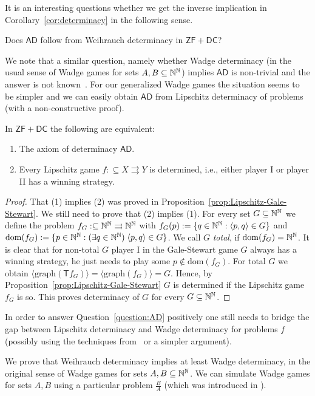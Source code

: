 \documentclass{amsart}
\def\IN{{\Bbb{N}}}
\def\In{\subseteq}
\def\mto{\rightrightarrows}
\def\T{{\mathsf{{T}}}}
\def\dom{{\mathrm{dom}}}
\def\graph{{\mathrm{graph}}}
\def\AD{\mathsf{AD}}
\def\ZF{\mathsf{ZF}}
\def\DC{\mathsf{DC}}
\begin{document}
It is an interesting questions whether we get the inverse implication in Corollary~\ref{cor:determinacy} in the following sense.

\begin{question}
\label{question:AD}
Does $\AD$ follow from Weihrauch determinacy in $\ZF+\DC$?
\end{question}

We note that a similar question, namely whether Wadge determinacy (in the usual sense of Wadge games for sets $A,B\In\IN^\IN$) implies $\AD$ is non-trivial and the answer is not known~\cite{And03,And06}.
For our generalized Wadge games the situation seems to be simpler and we can easily obtain $\AD$ from
Lipschitz determinacy of problems (with a non-constructive proof).

\begin{proposition}
\label{prop:Lipschitz-AD}
In $\ZF+\DC$ the following are equivalent:
\begin{enumerate}
\item The axiom of determinacy $\AD$.
\item Every Lipschitz game $f:\In X\mto Y$ is determined,
i.e., either player I or player II has a winning strategy.
\end{enumerate}
\end{proposition}
\begin{proof}
That (1) implies (2) was proved in Proposition~\ref{prop:Lipschitz-Gale-Stewart}. We still need to prove that (2) implies (1).
For every set $G\In\IN^\IN$ we define the problem $f_G:\In\IN^\IN\mto\IN^\IN$ with $f_G(p):=\{q\in\IN^\IN:\langle p,q\rangle\in G\}$
and $\dom(f_G):=\{p\in\IN^\IN:(\exists q\in \IN^\IN)\;\langle p,q\rangle\in G\}$. We call $G$ {\em total}, if $\dom(f_G)=\IN^\IN$.
It is clear that for non-total $G$ player I in the Gale-Stewart game $G$ always has a winning strategy, he just needs to play some
$p\not\in\dom(f_G)$. For total $G$ we obtain $\langle\graph(\T f_G)\rangle=\langle \graph(f_G)\rangle=G$. Hence, by Proposition~\ref{prop:Lipschitz-Gale-Stewart}
$G$ is determined if the Lipschitz game $f_G$ is so. This proves determinacy of $G$ for every $G\In\IN^\IN$.
\end{proof}

In order to answer Question~\ref{question:AD} positively one still needs to bridge the gap between Lipschitz determinacy and Wadge determinacy for problems $f$
(possibly using the techniques from~\cite{And03,And06} or a simpler argument).

We prove that Weihrauch determinacy implies at least Wadge determinacy, in the original sense of Wadge games for sets $A,B\In\IN^\IN$.
We can simulate Wadge games for sets $A,B$ using a particular problem $\frac{B}{A}$ (which was introduced in \cite{NP19}).
\end{document}
